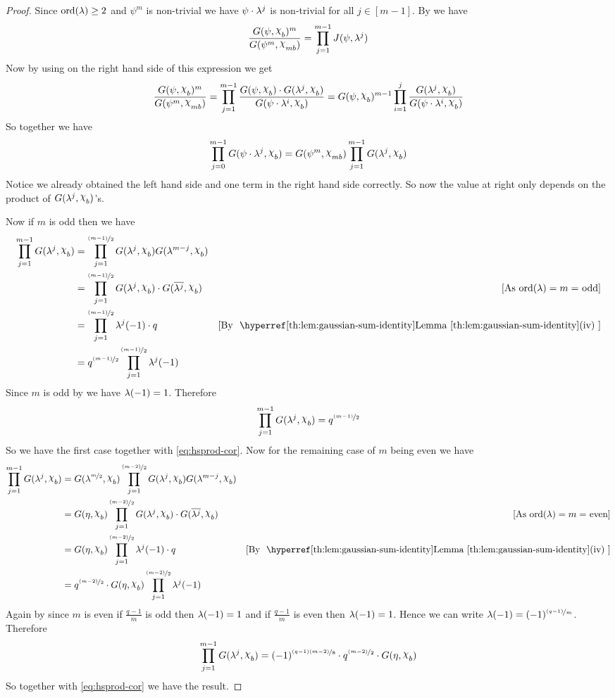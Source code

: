 \begin{proof}
  Since $\operatorname{ord}(\lambda)\geq 2$ and $\psi^m$ is non-trivial we have $\psi\cdot \lambda^j$ is non-trivial for all $j\in[m-1]$. By \DHprodthm we have $$\frac{G(\psi,\chi_b)^m}{G(\psi^m,\chi_{mb})}=\prod_{j=1}^{m-1}J(\psi,\lm^j)$$ Now by using  on the right hand side of this expression we get $$\frac{G(\psi,\chi_b)^m}{G(\psi^m,\chi_{mb})}=\prod_{j=1}^{m-1}\frac{G(\psi,\chi_b)\cdot G(\lm^j,\chi_b)}{G(\psi\cdot \lm^i,\chi_b)}=G(\psi,\chi_b)^{m-1}\prod_{i=1}^j \frac{G(\lm^j,\chi_b)}{G(\psi\cdot \lm^i,\chi_b)}$$So together we have \begin{equation}\label{eq:hsprod-cor}
    \prod_{j=0}^{m-1}G(\psi\cdot \lm^j,\chi_b)=G(\psi^m,\chi_{mb})\prod_{j=1}^{m-1}G(\lm^j,\chi_b)
  \end{equation}
  Notice we already obtained the left hand side and one term in the right hand side correctly. So now the value at right only depends on the product of $G(\lm^j,\chi_b)$'s.

  Now if $m$ is odd then we have \begin{align*}
    \prod_{j=1}^{m-1}G(\lm^j,\chi_b) & = \prod_{j=1}^{\nicefrac{(m-1)}{2}}G(\lm^j,\chi_b)G(\lm^{m-j},\chi_b)\\ 
    & = \prod_{j=1}^{\nicefrac{(m-1)}{2}}G(\lm^j,\chi_b)\cdot G(\ov{\lm^j},\chi_b) &[\text{As $\ord(\lm)=m=$ odd}]\\ 
    & = \prod_{j=1}^{\nicefrac{(m-1)}{2}} \lm^j(-1)\cdot q \byl[(iv)]{gaussian-sum-identity}\\ 
    & = q^{\nicefrac{(m-1)}{2}}\prod_{j=1}^{\nicefrac{(m-1)}{2}}\lm^j(-1)
  \end{align*}Since $m$ is odd by  we have $\lambda(-1)=1$. Therefore $$\prod_{j=1}^{m-1}G(\lm^j,\chi_b)=q^{\nicefrac{(m-1)}{2}}$$ 
  So we have the first case together with \eqref{eq:hsprod-cor}. Now for the remaining case of $m$ being even we have \begin{align*}
    \prod_{j=1}^{m-1}G(\lm^j,\chi_b) & = G(\lm^{\nicefrac{m}2},\chi_b)\prod_{j=1}^{\nicefrac{(m-2)}{2}}G(\lm^j,\chi_b)G(\lm^{m-j},\chi_b)\\ 
    & = G(\eta,\chi_b)\prod_{j=1}^{\nicefrac{(m-2)}{2}}G(\lm^j,\chi_b)\cdot G(\ov{\lm^j},\chi_b) &[\text{As $\ord(\lm)=m=$ even}]\\ 
    & = G(\eta,\chi_b)\prod_{j=1}^{\nicefrac{(m-2)}{2}} \lm^j(-1)\cdot q \byl[(iv)]{gaussian-sum-identity}\\ 
    & = q^{\nicefrac{(m-2)}{2}}\cdot G(\eta,\chi_b)\prod_{j=1}^{\nicefrac{(m-2)}{2}}\lm^j(-1)
  \end{align*}
  Again by  since $m$ is even if $\frac{q-1}{m}$ is odd then $\lambda(-1)=1$ and if $\frac{q-1}{m}$ is even then $\lambda(-1)=1$. Hence we can write $\lambda(-1)=(-1)^{\nicefrac{(q-1)}{m}}$. Therefore $$\prod_{j=1}^{m-1}G(\lm^j,\chi_b)=(-1)^{\nicefrac{(q-1)(m-2)}{8}}\cdot q^{\nicefrac{(m-2)}{2}}\cdot G(\eta,\chi_b)$$So together with \eqref{eq:hsprod-cor} we have the result.
\end{proof}


